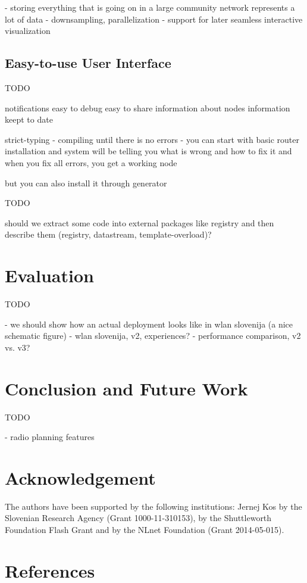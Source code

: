 \documentclass[5p,sort&compress]{elsarticle}
\begin{document}
- storing everything that is going on in a large community network represents a lot of data
- downsampling, parallelization
- support for later seamless interactive visualization

\subsection{Easy-to-use User Interface}

TODO

notifications
easy to debug
easy to share information about nodes
information keept to date

strict-typing - compiling until there is no errors - you can start with basic router installation and system will be telling you what is wrong and how to fix it and when you fix all errors, you get a working node

but you can also install it through generator

TODO

should we extract some code into external packages like registry and then describe them (registry, datastream, template-overload)?

\section{Evaluation}
\label{sec:evaluation}

TODO

- we should show how an actual deployment looks like in wlan slovenija (a nice schematic figure)
- wlan slovenija, v2, experiences?
- performance comparison, v2 vs. v3?

\section{Conclusion and Future Work}
\label{sec:conclusion}

TODO

- radio planning features

\section*{Acknowledgement}

The authors have been supported by the following institutions: Jernej Kos by the Slovenian Research Agency (Grant 1000-11-310153), by the Shuttleworth Foundation Flash Grant and by the NLnet Foundation (Grant 2014-05-015).

\section*{References}

\end{document}
